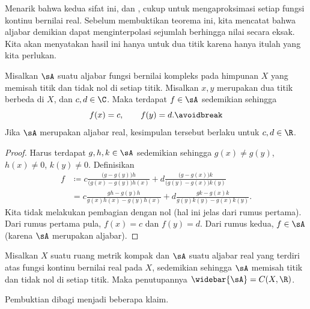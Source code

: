 Menarik bahwa kedua sifat ini,
 dan
, cukup untuk mengaproksimasi setiap fungsi
kontinu bernilai real. Sebelum membuktikan teorema ini, kita mencatat bahwa
aljabar demikian dapat menginterpolasi sejumlah berhingga nilai secara eksak.
Kita akan menyatakan hasil ini hanya untuk dua titik karena hanya itulah yang
kita perlukan.

\begin{prop} \label{prop:SWinterpolate}
Misalkan $\sA$ suatu aljabar fungsi bernilai kompleks pada himpunan $X$ yang
memisah titik dan tidak nol di setiap titik. Misalkan $x,y$ merupakan dua titik
berbeda di $X$, dan $c,d \in \C$. Maka terdapat $f \in \sA$ sedemikian sehingga
\begin{equation*}
f(x) = c, \qquad f(y) = d .
\avoidbreak
\end{equation*}
Jika $\sA$ merupakan aljabar real, kesimpulan tersebut berlaku untuk
$c,d \in \R$.
\end{prop}

\begin{proof}
Harus terdapat $g,h,k \in \sA$
sedemikian sehingga
$g(x) \neq g(y)$, $h(x) \neq 0$, $k(y) \neq 0$.
Definisikan
\begin{equation*}
\begin{split}
f & \coloneqq 
c
\frac{\bigl(g - g(y)\bigr)h}{\bigl(g(x)-g(y)\bigr)h(x) } + 
d
\frac{\bigl(g - g(x)\bigr)k}{\bigl(g(y)-g(x)\bigr)k(y)}
\\
& =
c
\frac{gh - g(y)h}{g(x)h(x)-g(y)h(x) } + 
d
\frac{gk - g(x)k}{g(y)k(y)-g(x)k(y)} .
\end{split}
\end{equation*}
Kita tidak melakukan pembagian dengan nol (hal ini jelas dari rumus pertama).
Dari rumus pertama pula, $f(x) = c$ dan $f(y) = d$.
Dari rumus kedua, $f \in \sA$ (karena $\sA$ merupakan aljabar).
\end{proof}

\begin{thm}
\label{thm:SWreal}%
%
Misalkan $X$ suatu ruang metrik kompak dan $\sA$ suatu aljabar real yang terdiri
atas fungsi kontinu bernilai real pada $X$, sedemikian sehingga $\sA$ memisah
titik dan tidak nol di setiap titik. Maka penutupannya
$\widebar{\sA} = C(X,\R)$.
\end{thm}

Pembuktian dibagi menjadi beberapa klaim.

\medskip

